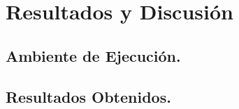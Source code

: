 \chapter{Resultados y Discusión}
\label{resultadosdiscusion}
\ifpdf
  \graphicspath{{Chapter6/Chapter6Figs/PNG/}{Chapter6/Chapter6Figs/PDF/}{Chapter6/Chapter6Figs/}}
\else
  \graphicspath{{Chapter6/Chapter6Figs/EPS/}{Chapter6/Chapter6Figs/}}
\fi


\section{Ambiente de Ejecución.}

\section{Resultados Obtenidos.}

